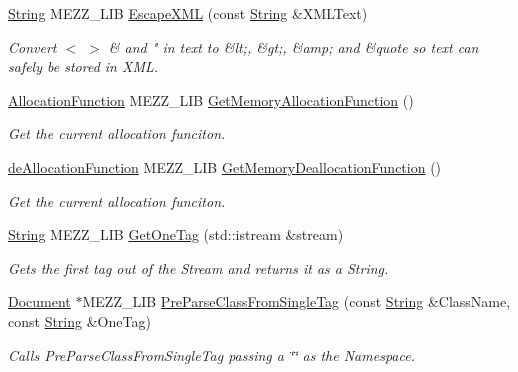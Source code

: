 \begin{DoxyCompactItemize}
\hyperlink{namespaceMezzanine_1_1xml_a3ddf35656ecc38b6fa1d0364d9ad3b2c}{String} MEZZ\_\-LIB \hyperlink{namespaceMezzanine_1_1xml_a64a1ff23404d94c97f898c9a3816f3aa}{EscapeXML} (const \hyperlink{namespaceMezzanine_1_1xml_a3ddf35656ecc38b6fa1d0364d9ad3b2c}{String} \&XMLText)
\begin{DoxyCompactList}\small\item\em Convert $<$ $>$ \& and " in text to \&lt;, \&gt;, \&amp; and \&quote so text can safely be stored in XML. \item\end{DoxyCompactList}\item 
\hyperlink{namespaceMezzanine_1_1xml_a63e924e0606b9268d2ac756d9b453e76}{AllocationFunction} MEZZ\_\-LIB \hyperlink{namespaceMezzanine_1_1xml_a31baea68d7e1fb4a2728dc2dbc314f99}{GetMemoryAllocationFunction} ()
\begin{DoxyCompactList}\small\item\em Get the current allocation funciton. \item\end{DoxyCompactList}\item 
\hyperlink{namespaceMezzanine_1_1xml_ab6e6202dc17fc372cddce061a45812d1}{deAllocationFunction} MEZZ\_\-LIB \hyperlink{namespaceMezzanine_1_1xml_a79299150ec78ed767931d86d8e0496a6}{GetMemoryDeallocationFunction} ()
\begin{DoxyCompactList}\small\item\em Get the current allocation funciton. \item\end{DoxyCompactList}\item 
\hyperlink{namespaceMezzanine_1_1xml_a3ddf35656ecc38b6fa1d0364d9ad3b2c}{String} MEZZ\_\-LIB \hyperlink{namespaceMezzanine_1_1xml_a4acd0a85d6e7e27cadab22203c6f41e4}{GetOneTag} (std::istream \&stream)
\begin{DoxyCompactList}\small\item\em Gets the first tag out of the Stream and returns it as a String. \item\end{DoxyCompactList}\item 
\hyperlink{classMezzanine_1_1xml_1_1Document}{Document} $\ast$MEZZ\_\-LIB \hyperlink{namespaceMezzanine_1_1xml_a95f62a3e002247b98f10a0e8b8027f4f}{PreParseClassFromSingleTag} (const \hyperlink{namespaceMezzanine_1_1xml_a3ddf35656ecc38b6fa1d0364d9ad3b2c}{String} \&ClassName, const \hyperlink{namespaceMezzanine_1_1xml_a3ddf35656ecc38b6fa1d0364d9ad3b2c}{String} \&OneTag)
\begin{DoxyCompactList}\small\item\em Calls PreParseClassFromSingleTag passing a \char`\"{}\char`\"{} as the Namespace. \item\end{DoxyCompactList}\item 

\end{DoxyCompactItemize}

